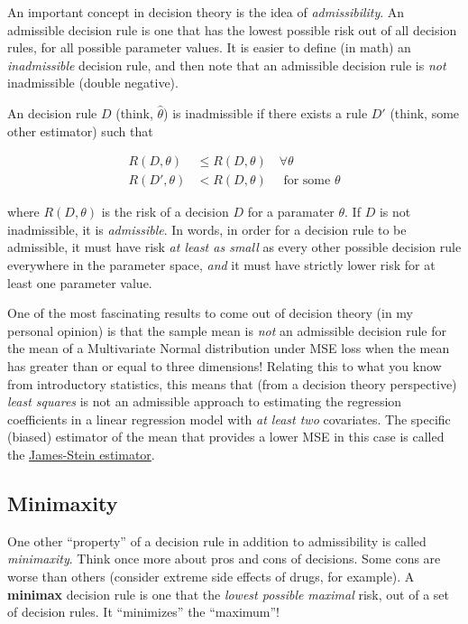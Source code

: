 \documentclass[
  letterpaper,
  DIV=11,
  numbers=noendperiod]{scrreprt}
\begin{document}
An important concept in decision theory is the idea of
\emph{admissibility}. An admissible decision rule is one that has the
lowest possible risk out of all decision rules, for all possible
parameter values. It is easier to define (in math) an
\emph{inadmissible} decision rule, and then note that an admissible
decision rule is \emph{not} inadmissible (double negative).

An decision rule \(D\) (think, \(\hat{\theta}\)) is inadmissible if
there exists a rule \(D'\) (think, some other estimator) such that

\begin{align*}
R(D, \theta) & \leq R(D, \theta) \quad \forall \theta \\
R(D', \theta) & < R(D, \theta) \quad \text{ for some } \theta
\end{align*}

where \(R(D, \theta)\) is the risk of a decision \(D\) for a paramater
\(\theta\). If \(D\) is not inadmissible, it is \emph{admissible}. In
words, in order for a decision rule to be admissible, it must have risk
\emph{at least as small} as every other possible decision rule
everywhere in the parameter space, \emph{and} it must have strictly
lower risk for at least one parameter value.

One of the most fascinating results to come out of decision theory (in
my personal opinion) is that the sample mean is \emph{not} an admissible
decision rule for the mean of a Multivariate Normal distribution under
MSE loss when the mean has greater than or equal to three dimensions!
Relating this to what you know from introductory statistics, this means
that (from a decision theory perspective) \emph{least squares} is not an
admissible approach to estimating the regression coefficients in a
linear regression model with \emph{at least two} covariates. The
specific (biased) estimator of the mean that provides a lower MSE in
this case is called the
\href{https://en.wikipedia.org/wiki/James\%E2\%80\%93Stein_estimator}{James-Stein
estimator}.

\subsection*{Minimaxity}\label{minimaxity}

One other ``property'' of a decision rule in addition to admissibility
is called \emph{minimaxity}. Think once more about pros and cons of
decisions. Some cons are worse than others (consider extreme side
effects of drugs, for example). A \textbf{minimax} decision rule is one
that the \emph{lowest possible} \emph{maximal} risk, out of a set of
decision rules. It ``minimizes'' the ``maximum''!
\end{document}
